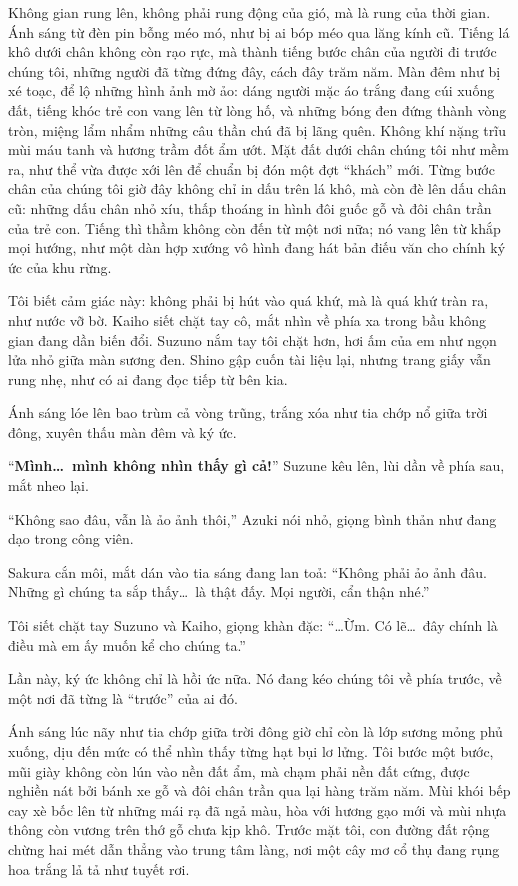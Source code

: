 \documentclass[../main.tex]{subfiles}
\begin{document}
Không gian rung lên, không phải rung động của gió, mà là rung của thời gian. Ánh sáng từ đèn pin bỗng méo mó, như bị ai bóp méo qua lăng kính cũ. Tiếng lá khô dưới chân không còn rạo rực, mà thành tiếng bước chân của người đi trước chúng tôi, những người đã từng đứng đây, cách đây trăm năm. Màn đêm như bị xé toạc, để lộ những hình ảnh mờ ảo: dáng người mặc áo trắng đang cúi xuống đất, tiếng khóc trẻ con vang lên từ lòng hố, và những bóng đen đứng thành vòng tròn, miệng lẩm nhẩm những câu thần chú đã bị lãng quên. Không khí nặng trĩu mùi máu tanh và hương trầm đốt ẩm ướt. Mặt đất dưới chân chúng tôi như mềm ra, như thể vừa được xới lên để chuẩn bị đón một đợt ``khách'' mới. Từng bước chân của chúng tôi giờ đây không chỉ in dấu trên lá khô, mà còn đè lên dấu chân cũ: những dấu chân nhỏ xíu, thấp thoáng in hình đôi guốc gỗ và đôi chân trần của trẻ con. Tiếng thì thầm không còn đến từ một nơi nữa; nó vang lên từ khắp mọi hướng, như một dàn hợp xướng vô hình đang hát bản điếu văn cho chính ký ức của khu rừng.

Tôi biết cảm giác này: không phải bị hút vào quá khứ, mà là quá khứ tràn ra, như nước vỡ bờ. Kaiho siết chặt tay cô, mắt nhìn về phía xa trong bầu không gian đang dần biến đổi. Suzuno nắm tay tôi chặt hơn, hơi ấm của em như ngọn lửa nhỏ giữa màn sương đen. Shino gập cuốn tài liệu lại, nhưng trang giấy vẫn rung nhẹ, như có ai đang đọc tiếp từ bên kia.

Ánh sáng lóe lên bao trùm cả vòng trũng, trắng xóa như tia chớp nổ giữa trời đông, xuyên thấu màn đêm và ký ức.

``\textbf{Mình\dots\ mình không nhìn thấy gì cả!}'' Suzune kêu lên, lùi dần về phía sau, mắt nheo lại.

``Không sao đâu, vẫn là ảo ảnh thôi,'' Azuki nói nhỏ, giọng bình thản như đang dạo trong công viên.

Sakura cắn môi, mắt dán vào tia sáng đang lan toả: ``Không phải ảo ảnh đâu. Những gì chúng ta sắp thấy\dots\ là thật đấy. Mọi người, cẩn thận nhé.''

Tôi siết chặt tay Suzuno và Kaiho, giọng khàn đặc: ``\dots Ừm. Có lẽ\dots\ đây chính là điều mà em ấy muốn kể cho chúng ta.''

Lần này, ký ức không chỉ là hồi ức nữa. Nó đang kéo chúng tôi về phía trước, về một nơi đã từng là ``trước'' của ai đó.

\ct

Ánh sáng lúc nãy như tia chớp giữa trời đông giờ chỉ còn là lớp sương mỏng phủ xuống, dịu đến mức có thể nhìn thấy từng hạt bụi lơ lửng. Tôi bước một bước, mũi giày không còn lún vào nền đất ẩm, mà chạm phải nền đất cứng, được nghiền nát bởi bánh xe gỗ và đôi chân trần qua lại hàng trăm năm. Mùi khói bếp cay xè bốc lên từ những mái rạ đã ngả màu, hòa với hương gạo mới và mùi nhựa thông còn vương trên thớ gỗ chưa kịp khô. Trước mặt tôi, con đường đất rộng chừng hai mét dẫn thẳng vào trung tâm làng, nơi một cây mơ cổ thụ đang rụng hoa trắng lả tả như tuyết rơi.
\end{document}
